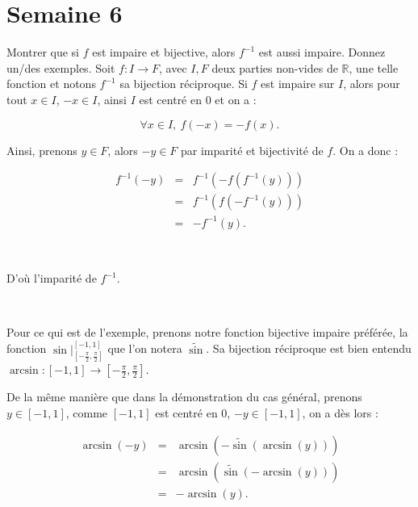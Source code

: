 \documentclass{article}
\begin{document}
\maketitle

\tableofcontents
\pagebreak\section{Semaine 6}


\begin{question_kholle}{Montrer que si $f$ est impaire et bijective, alors $f^{-1}$ est aussi impaire. Donnez un/des exemples.} 
	Soit $f: I \to F$, avec $I,F$ deux parties non-vides de $\mathbb{R}$, une telle fonction et notons $f^{-1}$ sa bijection réciproque. Si $f$ est impaire sur $I$, alors pour tout $x\in I$, $-x\in I$, ainsi $I$ est centré en $0$ et on a : 
	
	\begin{equation*}
	    \forall x \in I, \ f(-x) = -f(x).
	\end{equation*}
	
	Ainsi, prenons $y\in F$, alors $-y \in F$ par imparité et bijectivité de $f$. On a donc : 
	
	\begin{eqnarray*}
		f^{-1}(-y) & = & f^{-1}(-f(f^{-1}(y))) \\
			& = & f^{-1}(f(-f^{-1}(y))) \\
		    & = & -f^{-1}(y).
	\end{eqnarray*}
	
	\
	
	D'où l'imparité de $f^{-1}$.
	
	\
	
	Pour ce qui est de l'exemple, prenons notre fonction bijective impaire préférée, la fonction $\textstyle \sin |_{\left[ -\frac{\pi}{2}, \frac{\pi}{2}\right] }^{[-1,1]}$ que l'on notera $\widetilde{\sin}$. Sa bijection réciproque est bien entendu $\textstyle \arcsin : [-1,1] \to \left[ -\frac{\pi}{2}, \frac{\pi}{2}\right]$.
	
	De la même manière que dans la démonstration du cas général, prenons $y\in [-1, 1]$, comme $[-1,1]$ est centré en $0$, $-y\in [-1,1]$, on a dès lors : 
	
	\begin{eqnarray*}
		\arcsin(-y) & = & \arcsin(-\widetilde{\sin}(\arcsin(y))) \\
			& = & \arcsin(\widetilde{\sin}(-\arcsin(y))) \\
		    & = & -\arcsin(y).
	\end{eqnarray*}
\end{question_kholle}
\end{document}
